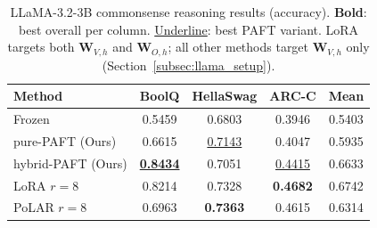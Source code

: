 \begin{table}[t]
\centering
\caption{LLaMA-3.2-3B commonsense reasoning results (accuracy). \textbf{Bold}: best overall per column. \underline{Underline}: best PAFT variant. LoRA targets both $\mathbf{W}_{V,h}$ and $\mathbf{W}_{O,h}$; all other methods target $\mathbf{W}_{V,h}$ only (Section~\ref{subsec:llama_setup}).}
\label{tab:llama_performance}
\begin{tabular}{lcccc}
\toprule
\textbf{Method} & \textbf{BoolQ} & \textbf{HellaSwag} & \textbf{ARC-C} & \textbf{Mean} \\
\midrule
Frozen & 0.5459 & 0.6803 & 0.3946 & 0.5403 \\
\midrule
pure-PAFT (Ours) & 0.6615 & \underline{0.7143} & 0.4047 & 0.5935 \\
hybrid-PAFT (Ours) & \textbf{\underline{0.8434}} & 0.7051 & \underline{0.4415} & 0.6633 \\
\midrule
LoRA $r{=}8$ & 0.8214 & 0.7328 & \textbf{0.4682} & 0.6742 \\
PoLAR $r{=}8$ & 0.6963 & \textbf{0.7363} & 0.4615 & 0.6314 \\
\bottomrule
\end{tabular}
\end{table}